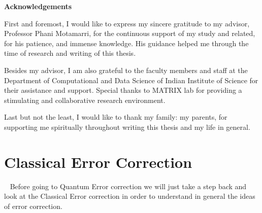 \documentclass[12pt, oneside]{book}
\theoremstyle{definition}
\theoremstyle{definition}
\theoremstyle{remark}
\newcommand{\acknowledgementsname}{Acknowledgements}
\newenvironment{Acknowledgements}{%
\clearpage
\null\vfill
\begin{center}%
    \bfseries \acknowledgementsname
\end{center}}%
{\vfill\null}
\begin{document}
\begin{Acknowledgements}
First and foremost, I would like to express my sincere gratitude to my advisor,
Professor Phani Motamarri, for the continuous support of my study and related, for
his patience, and immense knowledge.
His guidance helped me through the time of research and writing of this thesis.

Besides my advisor, I am also grateful to the faculty members and staff at the
Department of Computational and Data Science of Indian Institute of Science for
their assistance and support. Special thanks to MATRIX lab for providing a stimulating
and collaborative research environment.

Last but not the least, I would like to thank my family: my parents,
for supporting me spiritually throughout writing this thesis and my life in general.
\end{Acknowledgements}

\tableofcontents

\mainmatter



\chapter{Classical Error Correction}
~\cite{lidar2013quantum} Before going to Quantum Error correction we will just take a step back and look at the Classical Error correction in order to understand in general the ideas of error correction.
\end{document}
